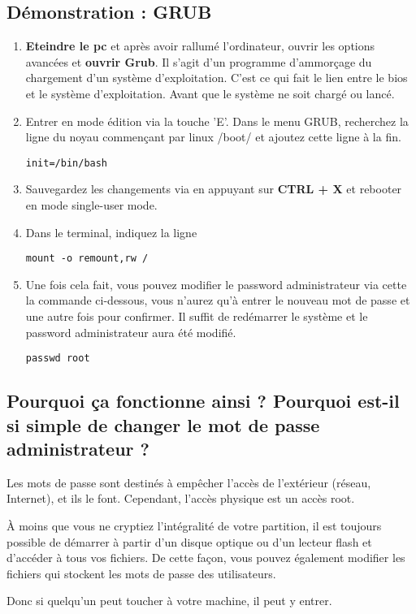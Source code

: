 \documentclass[a4paper, 12pt]{article}
\begin{document}
        \subsection{Démonstration : GRUB}
        \begin{enumerate}
        	\item \textbf{Eteindre le pc} et après avoir rallumé l'ordinateur, ouvrir les options avancées et \textbf{ouvrir Grub}. Il s'agit d'un programme d'ammorçage du chargement d'un système d'exploitation. C'est ce qui fait le lien entre le bios et le système d'exploitation. Avant que le système ne soit chargé ou lancé.
        	\item Entrer en mode édition via la touche 'E'. Dans le menu GRUB, recherchez la ligne du noyau commençant par linux /boot/ et ajoutez cette ligne à la fin.
        	\begin{lstlisting}
init=/bin/bash
        	\end{lstlisting}
        	\item Sauvegardez les changements via en appuyant sur \textbf{CTRL + X} et rebooter en mode single-user mode.
        	\item Dans le terminal, indiquez la ligne
        	\begin{lstlisting}
mount -o remount,rw /
        	\end{lstlisting}
        	\item Une fois cela fait, vous pouvez modifier le password administrateur via cette la commande ci-dessous, vous n'aurez qu'à entrer le nouveau mot de passe et une autre fois pour confirmer. Il suffit de redémarrer le système et le password administrateur aura été modifié. 
        	\begin{lstlisting}
passwd root
        	\end{lstlisting}
        \end{enumerate}
   \subsection{Pourquoi ça fonctionne ainsi ? Pourquoi est-il si simple de changer le mot de passe administrateur ?} 
   \begin{flushleft}
       \noindent Les mots de passe sont destinés à empêcher l'accès de l'extérieur (réseau, Internet), et ils le font. Cependant, l'accès physique est un accès root.
       \item À moins que vous ne cryptiez l'intégralité de votre partition, il est toujours possible de démarrer à partir d'un disque optique ou d'un lecteur flash et d'accéder à tous vos fichiers. De cette façon, vous pouvez également modifier les fichiers qui stockent les mots de passe des utilisateurs.
       \item Donc si quelqu'un peut toucher à votre machine, il peut y entrer.
   \end{flushleft}
\end{document}
